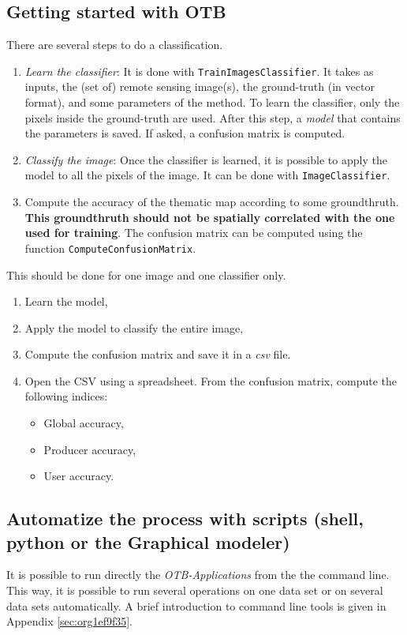 \documentclass[a4paper,11pt,DIV=18]{scrartcl}
\begin{document}
\subsection{Getting started with OTB}
\label{sec:org7761610}
There are several steps to do a classification.
\begin{enumerate}
\item \emph{Learn   the    classifier}:   It    is   done    with
\texttt{TrainImagesClassifier}.   It takes  as inputs,  the (set  of) remote
sensing  image(s), the  ground-truth (in  vector format),  and some
parameters of the method.  To learn the classifier, only the pixels
inside the  ground-truth are  used. After this  step, a  \emph{model} that
contains the parameters  is saved. If asked, a  confusion matrix is
computed.
\item \emph{Classify the image}: Once the  classifier is learned, it is possible
to apply the model to all the  pixels of the image.  It can be done
with \texttt{ImageClassifier}.
\item Compute the  accuracy of  the  thematic map  according to  some
groundthruth. \textbf{This groundthruth should  not be spatially correlated
with  the one  used  for  training}.  The  confusion  matrix can  be
computed using the function \texttt{ComputeConfusionMatrix}.
\end{enumerate}


\begin{work}
This should be done for one image and one classifier only.
\begin{enumerate}
\item Learn the model,
\item Apply the model to classify the entire image,
\item Compute the confusion matrix and save it in a \emph{csv} file.
\item Open  the CSV  using a spreadsheet.   From the  confusion matrix,
compute the following indices:
\begin{itemize}
\item Global accuracy,
\item Producer accuracy,
\item User accuracy.
\end{itemize}
\end{enumerate}
\end{work}

\subsection{Automatize the process with scripts (shell, python or the Graphical modeler)}
\label{sec:org0f3e303}
It  is possible  to run  directly  the \emph{OTB-Applications}  from the  the
command line.  This way, it is  possible to run several  operations on
one  data  set  or  on  several  data  sets  automatically.   A  brief
introduction to command line tools is given in Appendix \ref{sec:org1ef9f35}.
\end{document}
